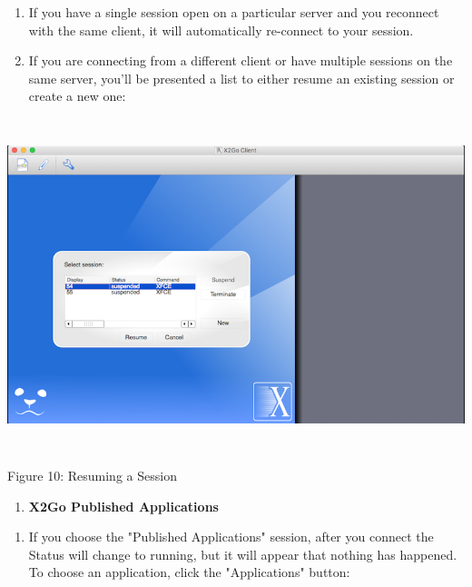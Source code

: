 \documentclass[
]{article}
\begin{document}
\begin{enumerate}
\def\labelenumi{\arabic{enumi}.}
\setcounter{enumi}{14}
\item
  If you have a single session open on a particular server and you
  reconnect with the same client, it will automatically re-connect to
  your session.
\item
  If you are connecting from a different client or have multiple
  sessions on the same server, you'll be presented a list to either
  resume an existing session or create a new one:
\end{enumerate}

\includegraphics[width=6.26806in,height=3.8057in]{images/media/image10.png}

Figure 10: Resuming a Session

\begin{enumerate}
\def\labelenumi{\Alph{enumi}.}
\setcounter{enumi}{5}
\item
  \textbf{X2Go Published Applications}
\end{enumerate}

\begin{enumerate}
\def\labelenumi{\arabic{enumi}.}
\setcounter{enumi}{16}
\item
  If you choose the "Published Applications" session, after you connect
  the Status will change to running, but it will appear that nothing has
  happened. To choose an application, click the "Applications" button:
\end{enumerate}
\end{document}
